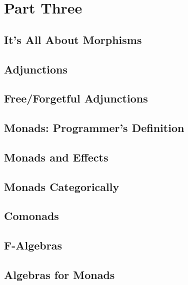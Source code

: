 \part{Part Three}

\chapter{It's All About Morphisms}


\chapter{Adjunctions}\label{adjunctions}


\chapter{Free/Forgetful Adjunctions}\label{free-forgetful-adjunctions}


\chapter{Monads: Programmer's Definition}\label{monads-programmers-definition}


\chapter{Monads and Effects}\label{monads-and-effects}


\chapter{Monads Categorically}\label{monads-categorically}


\chapter{Comonads}\label{comonads}


\chapter{F-Algebras}\label{f-algebras}


\chapter{Algebras for Monads}\label{algebras-for-monads}


